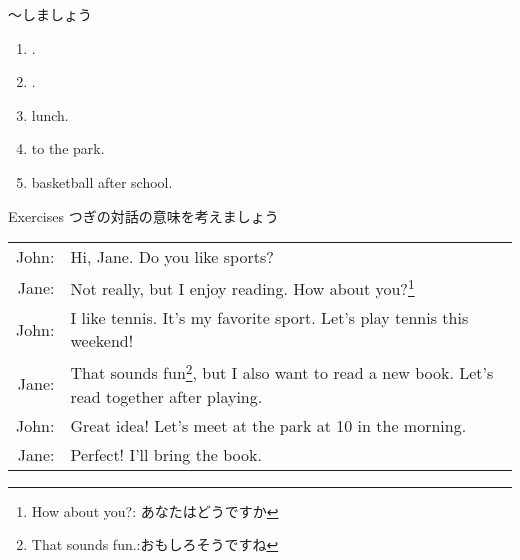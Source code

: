 \documentclass[aspectratio=169,xcolor={dvipsnames,table}]{beamer}
\begin{document}
\begin{frame}[plain]{～しましょう}
 \begin{enumerate}
  \item<1->  .
  \item<2->  .
  \item<3->   lunch. 
  \item<4->   to the park.
  \item<5->   basketball after school.
 \end{enumerate}

\hfill{}
\end{frame}
\begin{frame}[plain]{Exercises}
つぎの対話の意味を考えましょう\hfill{}


\begin{tabular}{rp{}}
John:& Hi, Jane. Do you like sports?\\
Jane:& Not really, but I enjoy reading. How about you?\footnote{How about you?: あなたはどうですか}\\
John:& I like tennis. It's my favorite sport. Let's play tennis this weekend!\\
Jane:& That sounds fun\footnote{That sounds fun.:おもしろそうですね}, but I also want to read a new book. Let's read together after playing.\\
John:& Great idea! Let's meet at the park at 10 in the morning.\\
Jane:& Perfect! I'll bring the book.
\end{tabular}

\end{frame}
\end{document}

